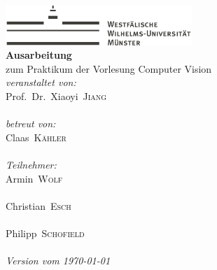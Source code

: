 
\begin{titlepage}
\begin{center}
\includegraphics[height=1.5cm, keepaspectratio]{images/Logo_WWU_Muenster.pdf} \\[1.0cm]
	{\Huge\sffamily\bfseries Ausarbeitung}\\[.8cm]
	{\large  zum Praktikum der Vorlesung  Computer Vision}\\[2.5cm]
	
	{\large \textit{veranstaltet von:}}\\[5pt]
	{\Large Prof.\ Dr.\ Xiaoyi\ \textsc{Jiang}}\\[4pt]
	{}\\[.5cm] 

	{\large \textit{betreut von:}}\\[5pt]
	{\Large Claas\ \textsc{Kähler}}\\[4pt]
	{}\\[3.5cm] 

	{\large \textit{Teilnehmer:}}\\[5pt]
	{\Large Armin\ \textsc{Wolf}}\\[4pt]
    {}\\[.5cm] 
	{\Large Christian\ \textsc{Esch}}\\[4pt]
	{}\\[.5cm] 
	{\Large Philipp\ \textsc{Schofield}}\\[4pt]
	{}\\[.5cm] 

	{\large\itshape Version vom \today}\\[1.5cm]
\end{center}
\end{titlepage}
